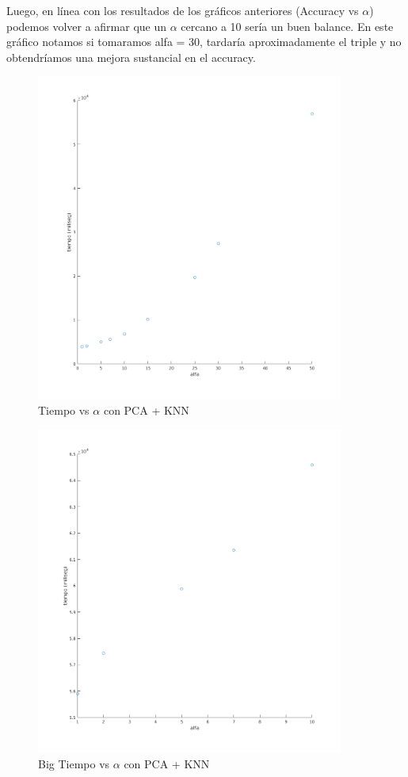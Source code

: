 Luego, en línea con los resultados de los gráficos anteriores (Accuracy vs $\alpha$) podemos volver a afirmar que un $\alpha$ cercano a 10 sería un buen balance. En este gráfico notamos si tomaramos alfa = 30, tardaría aproximadamente el triple y no obtendríamos una mejora sustancial en el accuracy.
\begin{figure}[H]
	\centering	\includegraphics[width=0.9\textwidth]{img/alfa_pca_tiempo.png}
	\caption{Tiempo vs $\alpha$ con PCA + KNN}
	\label{fig:Tiempo vs Alpha con PCA + KNN}
\end{figure}

\begin{figure}[H]
	\centering	\includegraphics[width=0.9\textwidth]{img/big_alfa_pca_tiempo.png}
	\caption{Big Tiempo vs $\alpha$ con PCA + KNN}
	\label{fig:Big Tiempo vs Alpha con PCA + KNN}
\end{figure}





